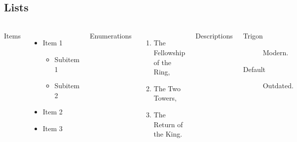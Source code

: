 \documentclass[aspectratio=169]{beamer}
\begin{document}
\subsection{Lists}
\begin{frame}{\insertsectionhead}
  \framesubtitle{\insertsubsectionhead}
  \begin{columns}[T,onlytextwidth]
    Items
    \begin{itemize}
      \item Item 1
        \begin{itemize}
          \item Subitem 1
          \item Subitem 2
        \end{itemize}
      \item Item 2
      \item Item 3
    \end{itemize}

    Enumerations
    \begin{enumerate}
      \item The Fellowship of the Ring,
      \item The Two Towers,
      \item The Return of the King.
    \end{enumerate}

    Descriptions
    \begin{description}
      \item[Trigon] Modern. \item[Default] Outdated.
    \end{description}
  \end{columns}
\end{frame}

\end{document}
